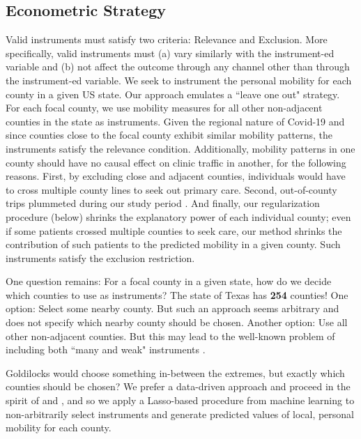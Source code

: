  
\subsection{Econometric Strategy} \label{econ_strat}
 Valid instruments must satisfy two criteria: Relevance and Exclusion. More specifically, valid instruments must (a) vary similarly with the instrument-ed variable and (b) not affect the outcome through any channel other than through the instrument-ed variable. We seek to instrument the personal mobility for each county in a given US state. Our approach emulates a “leave one out" strategy. For each focal county, we use mobility measures for all other non-adjacent counties in the state as instruments. Given the regional nature of Covid-19 and since counties close to the focal county exhibit similar mobility patterns, the instruments satisfy the relevance condition. Additionally, mobility patterns in one county should have no causal effect on clinic traffic in another, for the following reasons. First, by excluding close and adjacent counties, individuals would have to cross multiple county lines to seek out primary care. Second, out-of-county trips plummeted during our study period \citep{MTI2020}. And finally, our regularization procedure (below) shrinks the explanatory power of each individual county; even if some patients crossed multiple counties to seek care, our method shrinks the contribution of such patients to the predicted mobility in a given county. Such instruments satisfy the exclusion restriction.
 
 One question remains: For a focal county in a given state, how do we decide which counties to use as instruments? The state of Texas has \textbf{254} counties! One option: Select some nearby county. But such an approach seems arbitrary and does not specify which nearby county should be chosen. Another option: Use all other non-adjacent counties. But this may lead to the well-known problem of including both “many and weak" instruments \citep[p. 205]{Angrist2009}. 
 
 Goldilocks would choose something in-between the extremes, but exactly which counties should be chosen? We prefer a data-driven approach and proceed in the spirit of \cite{Belloni2012} and \cite{Belloni2011}, and so we apply a Lasso-based procedure from machine learning to non-arbitrarily select instruments and generate predicted values of local, personal mobility for each county.
 
